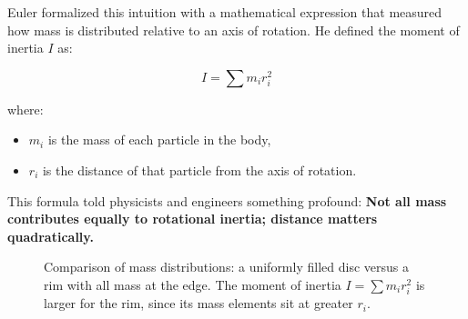 Euler formalized this intuition with a mathematical expression that measured how mass is distributed relative 
to an axis of rotation. He defined the moment of inertia \( I \) as:

\[
I = \sum m_i r_i^2
\]

where:

\begin{itemize}
    \item \( m_i \) is the mass of each particle in the body,
    \item \( r_i \) is the distance of that particle from the axis of rotation.
\end{itemize}

This formula told physicists and engineers something profound:  
\textbf{Not all mass contributes equally to rotational inertia; distance matters quadratically.}

\begin{figure}[H]
    \centering
    \caption{Comparison of mass distributions: a uniformly filled disc versus a rim with all mass at the edge.  The moment of inertia \(I=\sum m_ir_i^2\) is larger for the rim, since its mass elements sit at greater \(r_i\).}
    \label{fig:moment-of-inertia-distribution}
\end{figure}


